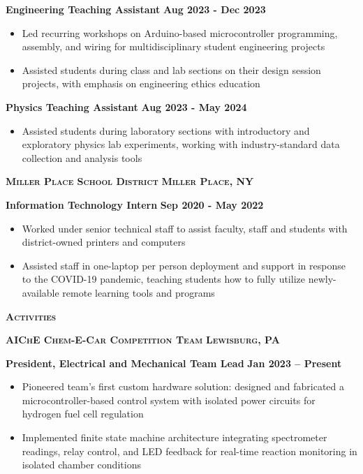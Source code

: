 \documentclass{article}
\newlength{\sectspaceabove}
\newlength{\sectspacebelow}
\newcommand{\textscbf}[1]{\textbf{\textsc{#1}}}
\newcommand{\resumesection}[1]{%
    \vspace{\sectspaceabove}%
    \begin{center}
        \textscbf{#1}
    \end{center}%
    \vspace{\sectspacebelow}%
}
\begin{document}
\textbf{Engineering Teaching Assistant} \hfill \textbf{Aug 2023 - Dec 2023}
\begin{itemize}[noitemsep,topsep=2pt]
	\item Led recurring workshops on Arduino-based microcontroller programming, assembly, and wiring for multidisciplinary student engineering projects
	\item Assisted students during class and lab sections on their design session projects, with emphasis on engineering ethics education
\end{itemize}

\textbf{Physics Teaching Assistant} \hfill \textbf{Aug 2023 - May 2024}
\begin{itemize}[noitemsep,topsep=2pt]
	\item Assisted students during laboratory sections with introductory and exploratory physics lab experiments, working with industry-standard data collection and analysis tools
\end{itemize}

\textscbf{Miller Place School District} \hfill \textscbf{Miller Place, NY}

\textbf{Information Technology Intern} \hfill \textbf{Sep 2020 - May 2022}
\begin{itemize}[noitemsep,topsep=2pt]
	\item Worked under senior technical staff to assist faculty, staff and students with district-owned printers and computers
	\item Assisted staff in one-laptop per person deployment and support in response to the COVID-19 pandemic, teaching students how to fully utilize newly-available remote learning tools and programs
\end{itemize}


\resumesection{Activities}

\textscbf{AIChE Chem-E-Car Competition Team} \hfill \textscbf{Lewisburg, PA}

\textbf{President, Electrical and Mechanical Team Lead} \hfill \textbf{Jan 2023 – Present}
\begin{itemize}[noitemsep,topsep=2pt]
	\item Pioneered team's first custom hardware solution: designed and fabricated a microcontroller-based control system with isolated power circuits for hydrogen fuel cell regulation
    \item Implemented finite state machine architecture integrating spectrometer readings, relay control, and LED feedback for real-time reaction monitoring in isolated chamber conditions
\end{itemize}
\end{document}

